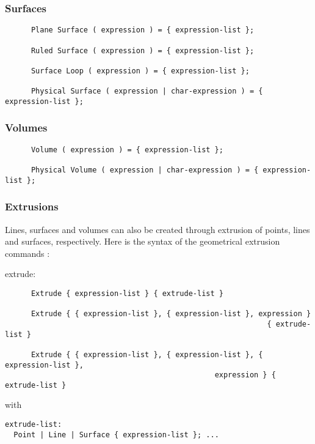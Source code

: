 \subsubsection{Surfaces}

\begin{verbatim}
      Plane Surface ( expression ) = { expression-list };

      Ruled Surface ( expression ) = { expression-list };

      Surface Loop ( expression ) = { expression-list };

      Physical Surface ( expression | char-expression ) = { expression-list };
\end{verbatim}


\subsubsection{Volumes}

\begin{verbatim}
      Volume ( expression ) = { expression-list };

      Physical Volume ( expression | char-expression ) = { expression-list };
\end{verbatim}
 

\subsubsection{Extrusions}

Lines, surfaces and volumes can also be created through extrusion of points, lines and surfaces, respectively. Here is the syntax of the geometrical extrusion commands :

extrude:

\begin{verbatim}
      Extrude { expression-list } { extrude-list }

      Extrude { { expression-list }, { expression-list }, expression } 
                                                            { extrude-list }
  
      Extrude { { expression-list }, { expression-list }, { expression-list },
                                                expression } { extrude-list } 
\end{verbatim}
  

with
\begin{verbatim}
extrude-list: 
  Point | Line | Surface { expression-list }; ...
\end{verbatim}


